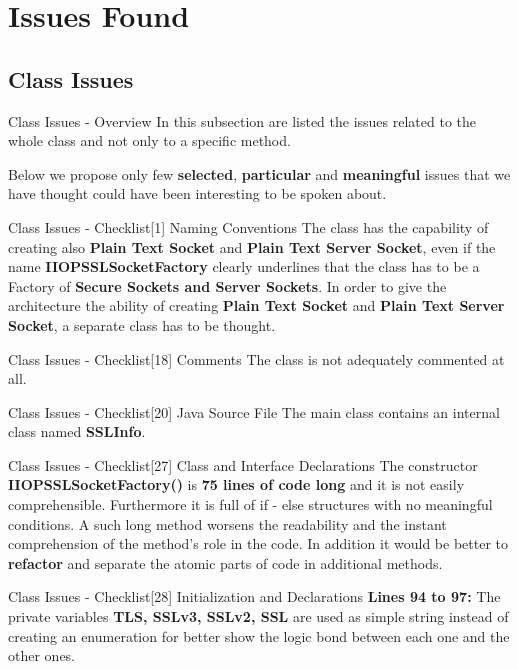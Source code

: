 \documentclass{../common/latex_classes/pdf_presentation}
\begin{document}
	\section{Issues Found}
	
	\subsection{Class Issues}
	
	\begin{frame}{Class Issues - Overview}
		In this subsection are listed the issues related to the whole class and not only to a specific method. \par Below we propose only few \textbf{selected}, \textbf{particular} and \textbf{meaningful} issues that we have thought could have been interesting to be spoken about.
	\end{frame}
	\begin{frame}{Class Issues - Checklist[1] Naming Conventions}
		The class has the capability of creating also \textbf{Plain Text Socket} and \textbf{Plain Text Server Socket}, even if the name \textbf{IIOPSSLSocketFactory} clearly underlines that the class has to be a Factory of \textbf{Secure Sockets and Server Sockets}. In order to give the architecture the ability of creating \textbf{Plain Text Socket} and \textbf{Plain Text Server Socket}, a separate class has to be thought.
	\end{frame}
	\begin{frame}{Class Issues - Checklist[18] Comments}
		The class is not adequately commented at all.
	\end{frame}
	\begin{frame}{Class Issues - Checklist[20] Java Source File}
		The main class contains an internal class named \textbf{SSLInfo}.
	\end{frame}
	\begin{frame}{Class Issues - Checklist[27] Class and Interface Declarations}
		The constructor \textbf{IIOPSSLSocketFactory()} is \textbf{75 lines of code long} and it is not easily comprehensible. Furthermore it is full of if - else structures with no meaningful conditions. A such long method worsens the readability and the instant comprehension of the method’s role in the code. In addition it would be better to \textbf{refactor} and separate the atomic parts of code in additional methods.
	\end{frame}
	\begin{frame}{Class Issues - Checklist[28] Initialization and Declarations}
		\textbf{Lines 94 to 97:} The private variables \textbf{TLS, SSLv3, SSLv2, SSL} are used as simple string instead of creating an enumeration for better show the logic bond between each one and the other ones.
	\end{frame}
\end{document}
